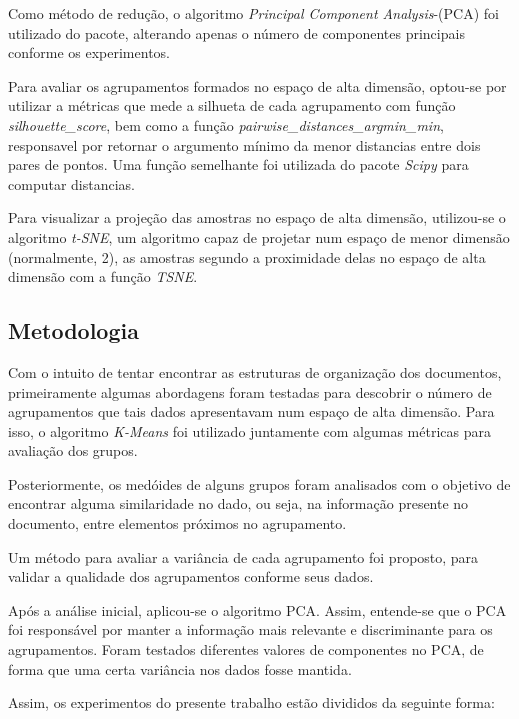 \documentclass[conference]{IEEEtran}
\begin{document}
Como método de redução, o algoritmo \emph{Principal Component Analysis}-(PCA) foi utilizado do pacote, alterando apenas o número de componentes principais conforme os experimentos.

Para avaliar os agrupamentos formados no espaço de alta dimensão, optou-se por utilizar a métricas que mede a silhueta de cada agrupamento com função \emph{silhouette\_score}, bem como a função \emph{pairwise\_distances\_argmin\_min}, responsavel por retornar o argumento mínimo da menor distancias entre dois pares de pontos. Uma função semelhante foi utilizada do pacote \emph{Scipy} para computar distancias.

Para visualizar a projeção das amostras no espaço de alta dimensão, utilizou-se o algoritmo \emph{t-SNE}, um algoritmo capaz de projetar num espaço de menor dimensão (normalmente, 2), as amostras segundo a proximidade delas no espaço de alta dimensão com a função \emph{TSNE}.


\subsection{Metodologia} \label{sec:met} 

Com o intuito de tentar encontrar as estruturas de organização dos documentos, primeiramente algumas abordagens foram testadas para descobrir o número de agrupamentos que tais dados apresentavam num espaço de alta dimensão. Para isso, o algoritmo \emph{K-Means} foi utilizado juntamente com algumas métricas para avaliação dos grupos.

Posteriormente, os medóides de alguns grupos foram analisados com o objetivo de encontrar alguma similaridade no dado, ou seja, na informação presente no documento, entre elementos próximos no agrupamento.

Um método para avaliar a variância de cada agrupamento foi proposto, para validar a qualidade dos agrupamentos conforme seus dados.

Após a análise inicial, aplicou-se o algoritmo PCA. Assim, entende-se que o PCA foi responsável por manter a informação mais relevante e discriminante para os agrupamentos. Foram testados diferentes valores de componentes no PCA, de forma que uma certa variância nos dados fosse mantida.

Assim, os experimentos do presente trabalho estão divididos da seguinte forma: 
\end{document}
